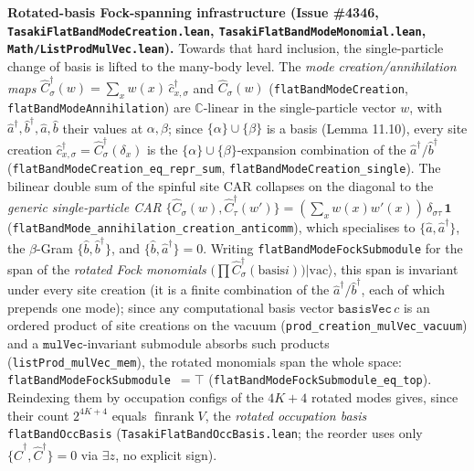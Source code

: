 \documentclass[a4paper,11pt]{article}
\begin{document}
\medskip
\noindent\textbf{Rotated-basis Fock-spanning infrastructure (Issue \#4346,
\texttt{TasakiFlatBandModeCreation.lean}, \texttt{TasakiFlatBandModeMonomial.lean},
\texttt{Math/ListProdMulVec.lean}).}  Towards that hard inclusion, the
single-particle change of basis is lifted to the many-body level.  The
\emph{mode creation/annihilation maps} $\hat C^\dagger_\sigma(w)=\sum_x w(x)\,\hat
c^\dagger_{x,\sigma}$ and $\hat C_\sigma(w)$ (\texttt{flatBandModeCreation},
\texttt{flatBandModeAnnihilation}) are $\mathbb C$-linear in the single-particle
vector $w$, with $\hat a^\dagger,\hat b^\dagger,\hat a,\hat b$ their values at
$\alpha,\beta$; since $\{\alpha\}\cup\{\beta\}$ is a basis (Lemma 11.10), every
site creation $\hat c^\dagger_{x,\sigma}=\hat C^\dagger_\sigma(\delta_x)$ is the
$\{\alpha\}\cup\{\beta\}$-expansion combination of the $\hat a^\dagger/\hat b^\dagger$
(\texttt{flatBandModeCreation\_eq\_repr\_sum}, \texttt{flatBandModeCreation\_single}).
The bilinear double sum of the spinful site CAR collapses on the diagonal to the
\emph{generic single-particle CAR} $\{\hat C_\sigma(w),\hat
C^\dagger_\tau(w')\}=(\sum_x w(x)w'(x))\,\delta_{\sigma\tau}\,\mathbf 1$
(\texttt{flatBandMode\_annihilation\_creation\_anticomm}), which specialises to
$\{\hat a,\hat a^\dagger\}$, the $\beta$-Gram $\{\hat b,\hat b^\dagger\}$, and
$\{\hat b,\hat a^\dagger\}=0$.  Writing \texttt{flatBandModeFockSubmodule} for the span
of the \emph{rotated Fock monomials} $\bigl(\prod \hat C^\dagger_\sigma(\text{basis
}i)\bigr)|\mathrm{vac}\rangle$, this span is invariant under every site creation
(it is a finite combination of the $\hat a^\dagger/\hat b^\dagger$, each of which
prepends one mode); since any computational basis vector $\mathtt{basisVec}\,c$ is
an ordered product of site creations on the vacuum
(\texttt{prod\_creation\_mulVec\_vacuum}) and a $\mathtt{mulVec}$-invariant
submodule absorbs such products (\texttt{listProd\_mulVec\_mem}), the rotated
monomials span the whole space: \texttt{flatBandModeFockSubmodule}~$=\top$
(\texttt{flatBandModeFockSubmodule\_eq\_top}).  Reindexing them by occupation
configs of the $4K{+}4$ rotated modes gives, since their count $2^{4K+4}$ equals
$\operatorname{finrank}V$, the \emph{rotated occupation basis}
\texttt{flatBandOccBasis} (\texttt{TasakiFlatBandOccBasis.lean}; the reorder uses
only $\{\hat C^\dagger,\hat C^\dagger\}=0$ via $\exists z$, no explicit sign).
\end{document}
